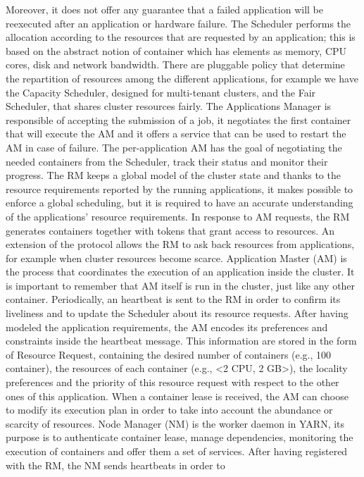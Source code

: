 Moreover, it does not offer any guarantee that a failed application will be reexecuted
after an application or hardware failure. The Scheduler performs
the allocation according to the resources that are requested by
an application; this is based on the abstract notion of container which
has elements as memory, CPU cores, disk and network bandwidth.
There are pluggable policy that determine the repartition of resources
among the different applications, for example we have the Capacity
Scheduler, designed for multi-tenant clusters, and the Fair Scheduler,
that shares cluster resources fairly.
The Applications Manager is responsible of accepting the submission
of a job, it negotiates the first container that will execute the AM and
it offers a service that can be used to restart the AM in case of failure.
The per-application AM has the goal of negotiating the needed
containers from the Scheduler, track their status and monitor their
progress.
The RM keeps a global model of the cluster state and thanks to the
resource requirements reported by the running applications, it makes
possible to enforce a global scheduling, but it is required to have an
accurate understanding of the applications’ resource requirements. In
response to AM requests, the RM generates containers together with
tokens that grant access to resources. An extension of the protocol
allows the RM to ask back resources from applications, for example
when cluster resources become scarce.
Application Master (AM) is the process that coordinates the execution
of an application inside the cluster. It is important to remember
that AM itself is run in the cluster, just like any other container. Periodically,
an heartbeat is sent to the RM in order to confirm its liveliness
and to update the Scheduler about its resource requests. After having
modeled the application requirements, the AM encodes its preferences
and constraints inside the heartbeat message. This information
are stored in the form of Resource Request, containing the desired number of containers (e.g., 100 container), the resources of each container
(e.g., <2 CPU, 2 GB>), the locality preferences and the priority of this
resource request with respect to the other ones of this application.
When a container lease is received, the AM can choose to modify its
execution plan in order to take into account the abundance or scarcity
of resources.
Node Manager (NM) is the worker daemon in YARN, its purpose
is to authenticate container lease, manage dependencies, monitoring
the execution of containers and offer them a set of services. After
having registered with the RM, the NM sends heartbeats in order to

